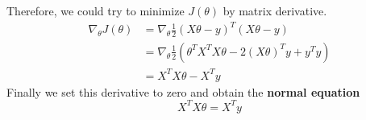 Therefore, we could try to minimize $J(\theta)$ by matrix derivative.
\begin{align*}
    \nabla_\theta J(\theta) &= \nabla_\theta \frac{1}{2}(X\theta - y)^T(X\theta - y)\\
                            &= \nabla_\theta \frac{1}{2}(\theta^TX^TX\theta - 2(X\theta)^Ty + y^Ty)\\
                            &= X^TX\theta - X^Ty
\end{align*}
Finally we set this derivative to zero and obtain the \textbf{normal equation}
\begin{equation}
    \label{LR: normeq}
    X^TX\theta = X^Ty
\end{equation}





 